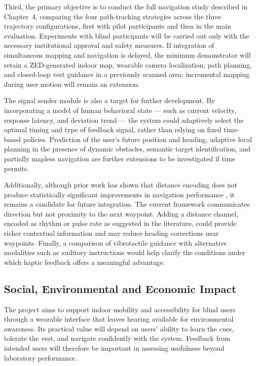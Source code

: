 \documentclass[12pt]{report}
\begin{document}
Third, the primary objective is to conduct the full navigation study described in Chapter~4, comparing the four path-tracking strategies across the three trajectory configurations, first with pilot participants and then in the main evaluation. Experiments with blind participants will be carried out only with the necessary institutional approval and safety measures. If integration of simultaneous mapping and navigation is delayed, the minimum demonstrator will retain a ZED-generated indoor map, wearable camera localization, path planning, and closed-loop vest guidance in a previously scanned area; incremental mapping during user motion will remain an extension.

The signal sender module is also a target for further development. By incorporating a model of human behavioral state --- such as current velocity, response latency, and deviation trend --- the system could adaptively select the optimal timing and type of feedback signal, rather than relying on fixed time-based policies. Prediction of the user's future position and heading, adaptive local planning in the presence of dynamic obstacles, semantic target identification, and partially mapless navigation are further extensions to be investigated if time permits.

Additionally, although prior work has shown that distance encoding does not produce statistically significant improvements in navigation performance \cite{vanveen2004waypoint}, it remains a candidate for future integration. The current framework communicates direction but not proximity to the next waypoint. Adding a distance channel, encoded as rhythm or pulse rate as suggested in the literature, could provide richer contextual information and may reduce heading corrections near waypoints. Finally, a comparison of vibrotactile guidance with alternative modalities such as auditory instructions would help clarify the conditions under which haptic feedback offers a meaningful advantage.

\subsection{Social, Environmental and Economic Impact}

The project aims to support indoor mobility and accessibility for blind users through a wearable interface that leaves hearing available for environmental awareness. Its practical value will depend on users' ability to learn the cues, tolerate the vest, and navigate confidently with the system. Feedback from intended users will therefore be important in assessing usefulness beyond laboratory performance.
\end{document}
